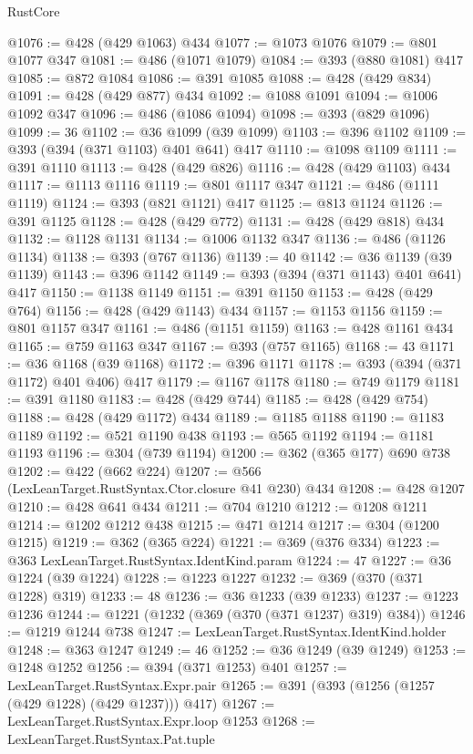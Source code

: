 \begin{lexlean}{RustCore}
\begin{coremodule}
@1076 := @428 (@429 @1063) @434
@1077 := @1073 @1076
@1079 := @801 @1077 @347
@1081 := @486 (@1071 @1079)
@1084 := @393 (@880 @1081) @417
@1085 := @872 @1084
@1086 := @391 @1085
@1088 := @428 (@429 @834)
@1091 := @428 (@429 @877) @434
@1092 := @1088 @1091
@1094 := @1006 @1092 @347
@1096 := @486 (@1086 @1094)
@1098 := @393 (@829 @1096)
@1099 := 36
@1102 := @36 @1099 (@39 @1099)
@1103 := @396 @1102
@1109 := @393 (@394 (@371 @1103) @401 @641) @417
@1110 := @1098 @1109
@1111 := @391 @1110
@1113 := @428 (@429 @826)
@1116 := @428 (@429 @1103) @434
@1117 := @1113 @1116
@1119 := @801 @1117 @347
@1121 := @486 (@1111 @1119)
@1124 := @393 (@821 @1121) @417
@1125 := @813 @1124
@1126 := @391 @1125
@1128 := @428 (@429 @772)
@1131 := @428 (@429 @818) @434
@1132 := @1128 @1131
@1134 := @1006 @1132 @347
@1136 := @486 (@1126 @1134)
@1138 := @393 (@767 @1136)
@1139 := 40
@1142 := @36 @1139 (@39 @1139)
@1143 := @396 @1142
@1149 := @393 (@394 (@371 @1143) @401 @641) @417
@1150 := @1138 @1149
@1151 := @391 @1150
@1153 := @428 (@429 @764)
@1156 := @428 (@429 @1143) @434
@1157 := @1153 @1156
@1159 := @801 @1157 @347
@1161 := @486 (@1151 @1159)
@1163 := @428 @1161 @434
@1165 := @759 @1163 @347
@1167 := @393 (@757 @1165)
@1168 := 43
@1171 := @36 @1168 (@39 @1168)
@1172 := @396 @1171
@1178 := @393 (@394 (@371 @1172) @401 @406) @417
@1179 := @1167 @1178
@1180 := @749 @1179
@1181 := @391 @1180
@1183 := @428 (@429 @744)
@1185 := @428 (@429 @754)
@1188 := @428 (@429 @1172) @434
@1189 := @1185 @1188
@1190 := @1183 @1189
@1192 := @521 @1190 @438
@1193 := @565 @1192
@1194 := @1181 @1193
@1196 := @304 (@739 @1194)
@1200 := @362 (@365 @177) @690 @738
@1202 := @422 (@662 @224)
@1207 := @566 (LexLeanTarget.RustSyntax.Ctor.closure @41 @230) @434
@1208 := @428 @1207
@1210 := @428 @641 @434
@1211 := @704 @1210
@1212 := @1208 @1211
@1214 := @1202 @1212 @438
@1215 := @471 @1214
@1217 := @304 (@1200 @1215)
@1219 := @362 (@365 @224)
@1221 := @369 (@376 @334)
@1223 := @363 LexLeanTarget.RustSyntax.IdentKind.param
@1224 := 47
@1227 := @36 @1224 (@39 @1224)
@1228 := @1223 @1227
@1232 := @369 (@370 (@371 @1228) @319)
@1233 := 48
@1236 := @36 @1233 (@39 @1233)
@1237 := @1223 @1236
@1244 := @1221 (@1232 (@369 (@370 (@371 @1237) @319) @384))
@1246 := @1219 @1244 @738
@1247 := LexLeanTarget.RustSyntax.IdentKind.holder
@1248 := @363 @1247
@1249 := 46
@1252 := @36 @1249 (@39 @1249)
@1253 := @1248 @1252
@1256 := @394 (@371 @1253) @401
@1257 := LexLeanTarget.RustSyntax.Expr.pair
@1265 := @391 (@393 (@1256 (@1257 (@429 @1228) (@429 @1237))) @417)
@1267 := LexLeanTarget.RustSyntax.Expr.loop @1253
@1268 := LexLeanTarget.RustSyntax.Pat.tuple

\end{coremodule}
\end{lexlean}
